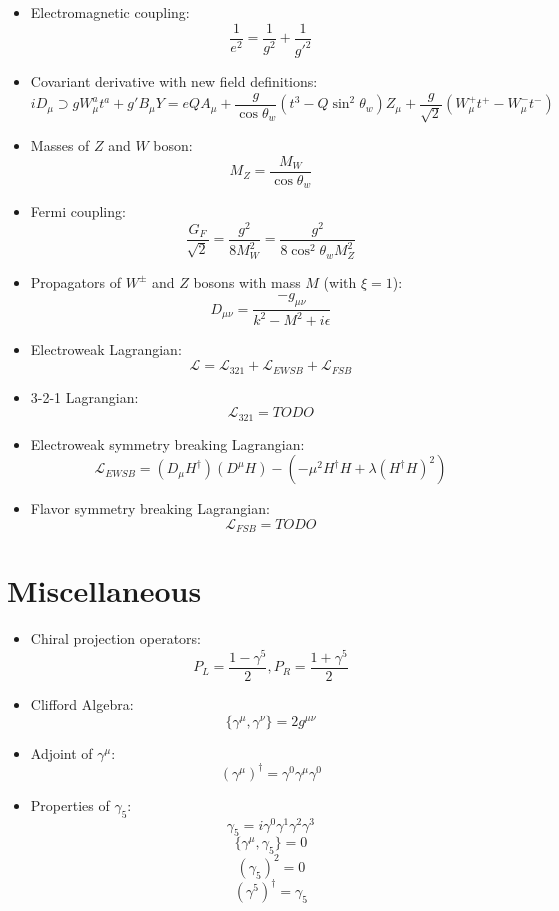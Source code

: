 \documentclass[11pt, oneside]{article}   	%
\theoremstyle{definition}
\begin{document}
\begin{itemize}
	\item Electromagnetic coupling:
	$$
		\frac{1}{e^2} = \frac{1}{g^2} + \frac{1}{g'^2}
	$$
	
	\item Covariant derivative with new field definitions:
	$$
		iD_\mu\supset g W_\mu^at^a + g' B_\mu Y = eQA_\mu + \frac{g}{\cos\theta_w} (t^3 - Q\sin^2\theta_w) Z_\mu + 
		\frac{g}{\sqrt{2}}(W_\mu^+ t^+ - W_\mu^-t^-)
	$$
	
	\item Masses of $Z$ and $W$ boson:
	$$
		M_Z = \frac{M_W}{\cos\theta_w}
	$$
	
	\item Fermi coupling:
	$$
		\frac{G_F}{\sqrt 2} = \frac{g^2}{8M_W^2} = \frac{g^2}{8\cos^2\theta_w M_Z^2}
	$$
	
	\item Propagators of $W^\pm$ and $Z$ bosons with mass $M$ (with $\xi = 1$):
	$$
		D_{\mu\nu} = \frac{-g_{\mu\nu}}{k^2 - M^2 + i\epsilon}
	$$
	
	\item Electroweak Lagrangian:
	$$
		\mathcal L = \mathcal L_{321} + \mathcal L_{EWSB} + \mathcal L_{FSB}
	$$
	
	\item 3-2-1 Lagrangian:
	$$
		\mathcal L_{321} = TODO 
	$$
	
	\item Electroweak symmetry breaking Lagrangian:
	$$
		\mathcal L_{EWSB} = (D_\mu H^\dagger)(D^\mu H) - (-\mu^2 H^\dagger H + \lambda (H^\dagger H)^2)
	$$
	
	\item Flavor symmetry breaking Lagrangian:
	$$
		\mathcal L_{FSB} = TODO
	$$
	

\end{itemize}

\section*{Miscellaneous}

\begin{itemize}

	\item Chiral projection operators:
	$$
		P_L = \frac{1 - \gamma^5}{2}, P_R = \frac{1 + \gamma^5}{2}
	$$
	
	\item Clifford Algebra:
	$$
		\{\gamma^\mu, \gamma^\nu\} = 2g^{\mu\nu}
	$$
	
	\item Adjoint of $\gamma^\mu$:
	$$
		(\gamma^\mu)^\dagger = \gamma^0\gamma^\mu\gamma^0
	$$
	
	\item Properties of $\gamma_5$:
	$$
		\gamma_5 = i\gamma^0\gamma^1\gamma^2\gamma^3
	$$
	$$
		\{\gamma^\mu, \gamma_5\} = 0
	$$
	$$
		(\gamma_5)^2 = 0
	$$
	$$
		(\gamma^5)^\dagger = \gamma_5
	$$

\end{itemize}
\end{document}
